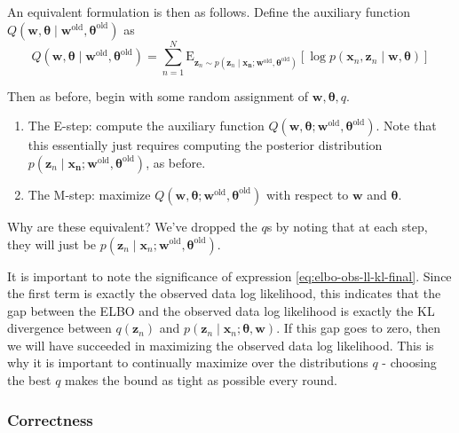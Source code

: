 An equivalent formulation is then as follows. Define the auxiliary function $Q(\mathbf{w}, \boldsymbol{\theta}\mid \mathbf{w}^\text{old}, \boldsymbol{\theta}^\text{old})$ as
\begin{equation}
    Q(\mathbf{w}, \boldsymbol{\theta}\mid \mathbf{w}^\text{old}, \boldsymbol{\theta}^\text{old}) = \sum_{n = 1} ^N \mathrm{E}_{\mathbf{z}_n \sim p(\mathbf{z}_n \mid \mathbf{x_n}; \mathbf{w}^\text{old}, \boldsymbol{\theta}^\text{old})} \left[\log p(\mathbf{x}_n, \mathbf{z}_n \mid \mathbf{w}, \boldsymbol{\theta})\right]
\end{equation}

Then as before, begin with some random assignment of $\mathbf{w}, \boldsymbol{\theta}, q$. 
\begin{enumerate}
    \item The E-step: compute the auxiliary function $Q(\mathbf{w}, \boldsymbol{\theta}; \mathbf{w}^\text{old}, \boldsymbol{\theta}^\text{old})$. Note that this essentially just requires computing the posterior distribution $p(\mathbf{z}_n \mid \mathbf{x_n}; \mathbf{w}^\text{old}, \boldsymbol{\theta}^\text{old})$, as before.
    \item The M-step: maximize $Q(\mathbf{w}, \boldsymbol{\theta}; \mathbf{w}^\text{old}, \boldsymbol{\theta}^\text{old})$ with respect to $\mathbf{w}$ and $\boldsymbol{\theta}$. 
\end{enumerate}
Why are these equivalent? We've dropped the $q$s by noting that at each step, they will just be $p(\mathbf{z}_n \mid \mathbf{x}_n ; \mathbf{w}^\text{old}, \boldsymbol{\theta}^\text{old})$. 

It is important to note the significance of expression \eqref{eq:elbo-obs-ll-kl-final}. Since the first term is exactly the observed data log likelihood, this indicates that the gap between the ELBO and the observed data log likelihood is exactly the KL divergence between $q(\mathbf{z}_n)$ and $p(\mathbf{z}_n \mid \mathbf{x}_n; \boldsymbol{\theta}, \mathbf{w})$. If this gap goes to zero, then we will have succeeded in maximizing the observed data log likelihood. This is why it is important to continually maximize over the distributions $q$ - choosing the best $q$ makes the bound as tight as possible every round. 

\subsubsection{Correctness}

